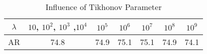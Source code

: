 \begin{table}[ht]
  \centering
  \caption{Influence of Tikhonov Parameter}
  \begin{tabular}{c|c|c|c|c|c|c}
    \toprule
    $\lambda$ & $10$, $10^2$, $10^3$ ,$10^4$ & $10^5$ & $10^6$ & $10^7$ & $10^8$ & $10^9$ \\
    \midrule
    AR & 74.8 & 74.9 &75.1 &75.1 &74.9 &74.1 \\
    \bottomrule
  \end{tabular}
  \label{tab:Tikhonov Parameter}
  \vspace{-0.2cm}
\end{table}

